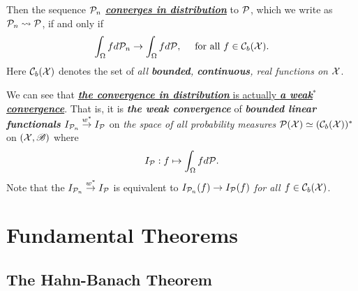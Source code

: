 \documentclass[11pt]{article}
\begin{document}
\begin{itemize}
\begin{example}
\begin{definition}
Then the sequence ${\mathcal P}_n$ \underline{\emph{\textbf{converges in distribution}}} to ${\mathcal P}$, which we write as ${\mathcal P}_n \rightsquigarrow {\mathcal P}$, if and only if
\begin{align*}
\int_{\Omega} f d{\mathcal P}_n \rightarrow \int_{\Omega} f d{\mathcal P}, \quad \text{ for all } f \in {\mathcal C}_{b}({\mathcal X}).
\end{align*}
Here ${\mathcal C}_{b}({\mathcal X})$ denotes the set of \emph{all \textbf{bounded}, \textbf{continuous}, real functions on ${\mathcal X}$}.
\end{definition} 
We can see that \underline{\emph{\textbf{the convergence in distribution}} is actually \emph{\textbf{a weak$^{*}$ convergence}}}. That is, it is \emph{\textbf{the weak convergence}} of  \emph{\textbf{bounded linear functionals}} $I_{{\mathcal P}_n} \stackrel{w^{*}}{\rightarrow} I_{{\mathcal P}}$ on \emph{the space of all probability measures} ${\mathcal P}({\mathcal X}) \simeq ({\mathcal C}_{b}({\mathcal X}))^{*}$ on $({\mathcal X}, {\mathscr B})$ where 
\begin{align*}
I_{{\mathcal P}}: f \mapsto \int_{\Omega} f d{\mathcal P}.
\end{align*} Note that the $I_{{\mathcal P}_n} \stackrel{w^{*}}{\rightarrow} I_{{\mathcal P}}$ is equivalent to $I_{{\mathcal P}_n}(f) \rightarrow I_{{\mathcal P}}(f)$ \emph{for all $f \in  {\mathcal C}_{b}({\mathcal X})$}.

\end{example}
\end{itemize}

\section{Fundamental Theorems}
\subsection{The Hahn-Banach Theorem}
\end{document}

